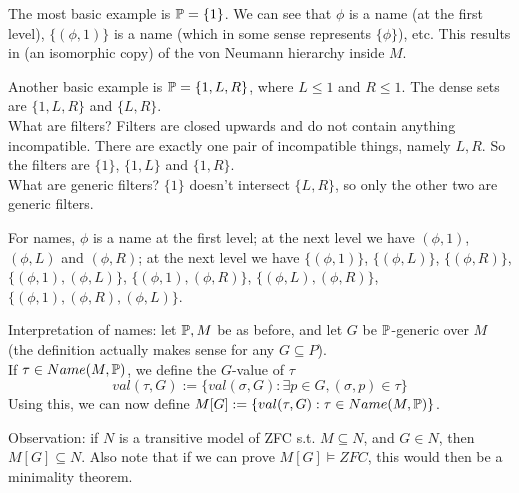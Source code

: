 \documentclass[a4paper]{article}
\begin{document}
\begin{eg}
The most basic example is $\P=\{1\}$. We can see that $\phi$ is a name (at the first level), $\{(\phi,1)\}$ is a name (which in some sense represents $\{\phi\}$), etc. This results in (an isomorphic copy) of the von Neumann hierarchy inside $M$.
\end{eg}

\begin{eg}
Another basic example is $\P=\{1,L,R\}$, where $L \leq 1$ and $R \leq 1$. The dense sets are $\{1,L,R\}$ and $\{L,R\}$.\\
What are filters? Filters are closed upwards and do not contain anything incompatible. There are exactly one pair of incompatible things, namely $L,R$. So the filters are $\{1\}$, $\{1,L\}$ and $\{1,R\}$.\\
What are generic filters? $\{1\}$ doesn't intersect $\{L,R\}$, so only the other two are generic filters.

For names, $\phi$ is a name at the first level; at the next level we have $(\phi,1)$, $(\phi,L)$ and $(\phi,R)$; at the next level we have $\{(\phi,1)\}$, $\{(\phi,L)\}$, $\{(\phi,R)\}$, $\{(\phi,1),(\phi,L)\}$, $\{(\phi,1),(\phi,R)\}$, $\{(\phi,L),(\phi,R)\}$, $\{(\phi,1),(\phi,R),(\phi,L)\}$.
\end{eg}

Interpretation of names: let $\P,M$ be as before, and let $G$ be $\P$-generic over $M$ (the definition actually makes sense for any $G \subseteq P$).\\
If $\tau \in Name(M,\P)$, we define the $G$-value of $\tau$
\[
val(\tau,G) := \{val(\sigma,G): \exists p \in G, (\sigma,p) \in \tau\}
\]
Using this, we can now define $M[G] := \{val(\tau,G): \tau \in Name(M,\P)\}$.

Observation: if $N$ is a transitive model of ZFC s.t. $M \subseteq N$, and $G \in N$, then $M[G] \subseteq N$. Also note that if we can prove $M[G] \vDash ZFC$, this would then be a minimality theorem.
\end{document}
